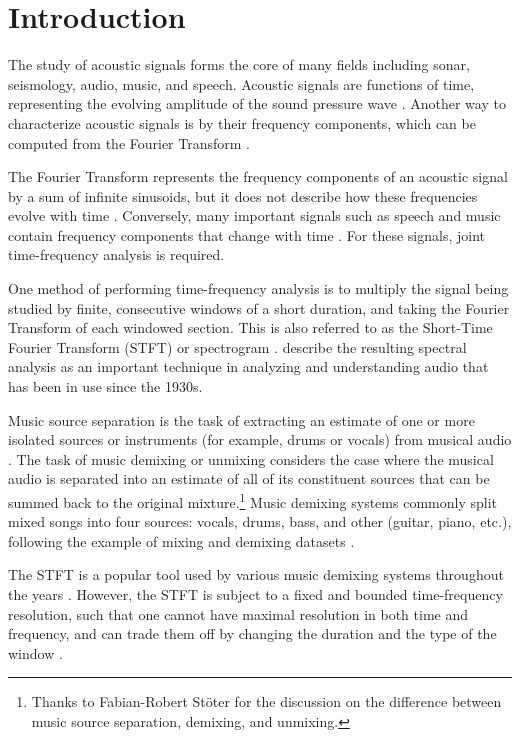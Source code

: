 \documentclass[report.tex]{subfiles}
\begin{document}
\section{Introduction}
\label{ch:intro}

The study of acoustic signals forms the core of many fields including sonar, seismology, audio, music, and speech. Acoustic signals are functions of time, representing the evolving amplitude of the sound pressure wave \parencite{melbook}. Another way to characterize acoustic signals is by their frequency components, which can be computed from the Fourier Transform \parencite{melbook}.

The Fourier Transform represents the frequency components of an acoustic signal by a sum of infinite sinusoids, but it does not describe how these frequencies evolve with time \parencite{gabordiagrams}. Conversely, many important signals such as speech and music contain frequency components that change with time \parencite{gabor1946}. For these signals, joint time-frequency analysis is required.

One method of performing time-frequency analysis is to multiply the signal being studied by finite, consecutive windows of a short duration, and taking the Fourier Transform of each windowed section. This is also referred to as the Short-Time Fourier Transform (STFT) or spectrogram \parencite{melbook}. \textcite{melbook} describe the resulting spectral analysis as an important technique in analyzing and understanding audio that has been in use since the 1930s.

Music source separation is the task of extracting an estimate of one or more isolated sources or instruments (for example, drums or vocals) from musical audio \parencite{musicsepgood, musicmask}. The task of music demixing or unmixing considers the case where the musical audio is separated into an estimate of all of its constituent sources that can be summed back to the original mixture.\footnote{Thanks to Fabian-Robert St{\"o}ter for the discussion on the difference between music source separation, demixing, and unmixing.} Music demixing systems commonly split mixed songs into four sources: vocals, drums, bass, and other (guitar, piano, etc.), following the example of mixing and demixing datasets \parencite{sisec2016, otherdataset2, musdb18, musdb18hq}.

The STFT is a popular tool used by various music demixing systems throughout the years \parencite{musicsepgood, musicmask, sisec2018, fitzgerald1, umx, plumbley1, plumbley2}. However, the STFT is subject to a fixed and bounded time-frequency resolution, such that one cannot have maximal resolution in both time and frequency, and can trade them off by changing the duration and the type of the window \parencite{gabor1946, gabordiagrams}.
\end{document}
